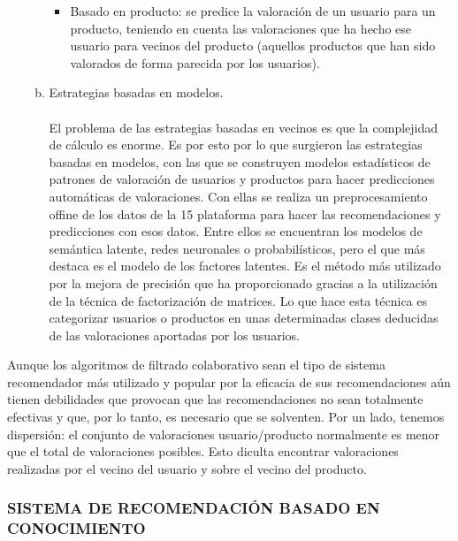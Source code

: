 \documentclass[11pt,a4paper]{article}
\begin{document}
\begin{enumerate}[A.]
\begin{enumerate}[a.]
\begin{itemize}
	 					\item Basado en producto: se predice la valoración de un usuario para un producto, teniendo en cuenta las valoraciones que ha hecho ese usuario para vecinos del producto (aquellos productos que han sido valorados de forma parecida por los usuarios). 
	 				\end{itemize}
	 				\newpage
	 				\item Estrategias basadas en modelos. \\
	 				\\
	 				El problema de las estrategias basadas en vecinos es que la complejidad de cálculo es enorme. Es por esto por lo que surgieron las estrategias basadas en modelos, con las que se construyen modelos estadísticos de patrones de valoración de usuarios y productos para hacer predicciones automáticas de valoraciones. Con ellas se realiza un preprocesamiento offine de los datos de la 15 plataforma para hacer las recomendaciones y predicciones con esos datos. Entre ellos se encuentran los modelos de semántica latente, redes neuronales o probabilísticos, pero el que más destaca es el modelo de los factores latentes. Es el método más utilizado por la mejora de precisión que ha proporcionado gracias a la utilización de la técnica de factorización de matrices. Lo que hace esta técnica es categorizar usuarios o productos en unas determinadas clases deducidas de las valoraciones aportadas por los usuarios.
	 				
	 			\end{enumerate}
 						
		 		
		 	\end{enumerate}
	 		Aunque los algoritmos de filtrado colaborativo sean el tipo de sistema recomendador más utilizado y popular por la eficacia de sus recomendaciones aún tienen debilidades que provocan que las recomendaciones no sean totalmente efectivas y que, por lo tanto, es necesario que se solventen. Por un lado, tenemos dispersión: el conjunto de valoraciones usuario/producto normalmente es menor que el total de valoraciones posibles. Esto diculta encontrar valoraciones realizadas por el vecino del usuario y sobre el vecino del producto.\cite{nro1:Online}
		 
		 \subsubsection{SISTEMA DE RECOMENDACIÓN BASADO EN CONOCIMIENTO }
		 
\end{document}
